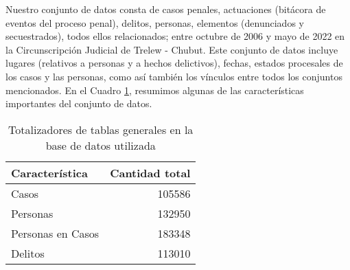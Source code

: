 Nuestro conjunto de datos consta de casos penales, actuaciones (bitácora de eventos del proceso penal), delitos, personas, elementos (denunciados y secuestrados), todos ellos relacionados; entre octubre de 2006 y mayo de 2022 en la Circunscripción Judicial de Trelew - Chubut. Este conjunto de datos incluye lugares (relativos a personas y a hechos delictivos), fechas, estados procesales de los casos y las personas, como así también los vínculos entre todos los conjuntos mencionados. En el Cuadro \ref{tab:TotalizadoresGenerales}, resumimos algunas de las características importantes del conjunto de datos.

\begin{table}
	\caption{Totalizadores de tablas generales en la base de datos utilizada}
	\label{tab:TotalizadoresGenerales}
	\centering
	\begin{tabular}{|l|r|}
		\hline
		\textbf{Característica} &  \textbf{Cantidad total} \\
		\hline
		Casos &  105586 \\
		\hline
		Personas &  132950 \\
		\hline
		Personas en Casos &  183348 \\
		\hline
		Delitos &  113010 \\
		\hline
	\end{tabular}
\end{table}

